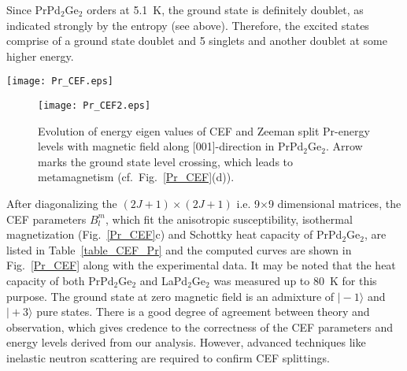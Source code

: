 \documentclass[preprint,showpacs,preprintnumbers,amsmath,amssymb, prb]{revtex4}
\begin{document}
Since PrPd$_2$Ge$_2$ orders at 5.1~K, the ground state is definitely doublet, as indicated strongly by the entropy (see above). Therefore, the excited states comprise of a ground state doublet and 5 singlets and another doublet at some higher energy. 
\begin{figure*}[!]
\centering
\texttt{[image: Pr\_CEF.eps]}
\caption{\label{Pr_CEF} A comparison of calculated (a) inverse susceptibility at 0.1~T, (b) heat capacity and (c) isothermal magnetization derived from CEF eigenstates and eigen values with the corresponding experimental data. (d) Calculated magnetization of PrPd$_2$Ge$_2$ up to 100~Tesla at 1.8~K (main panel) and at 10~mK (inset) }
\end{figure*}
\begin{figure}[!]
\centering
\texttt{[image: Pr\_CEF2.eps]}
\caption{\label{Pr_CEF2} Evolution of energy eigen values of CEF and Zeeman split Pr-energy levels with magnetic field along [001]\--direction in PrPd$_2$Ge$_2$. Arrow marks the ground state level crossing, which leads to metamagnetism (cf.~Fig.~\ref{Pr_CEF}(d)). }
\end{figure}

After diagonalizing the $(2J+1)\times (2J+1)$ i.e. 9$\times$9 dimensional matrices, the CEF parameters $B_l^m$, which fit the anisotropic susceptibility, isothermal magnetization (Fig.~\ref{Pr_CEF}c) and Schottky heat capacity of PrPd$_2$Ge$_2$, are listed in Table~\ref{table_CEF_Pr} and the computed curves are shown in Fig.~\ref{Pr_CEF} along with the experimental data. It may be noted that the heat capacity of both PrPd$_2$Ge$_2$ and LaPd$_2$Ge$_2$ was measured up to 80~K for this purpose. The ground state at zero magnetic field is an admixture of  $\mid-1\rangle$ and $\mid+3\rangle$ pure states.
There is a good degree of agreement between theory and observation, which gives credence to the correctness of the CEF parameters and energy levels derived from our analysis. However, advanced techniques like inelastic neutron scattering are required to confirm CEF splittings.
\end{document}
